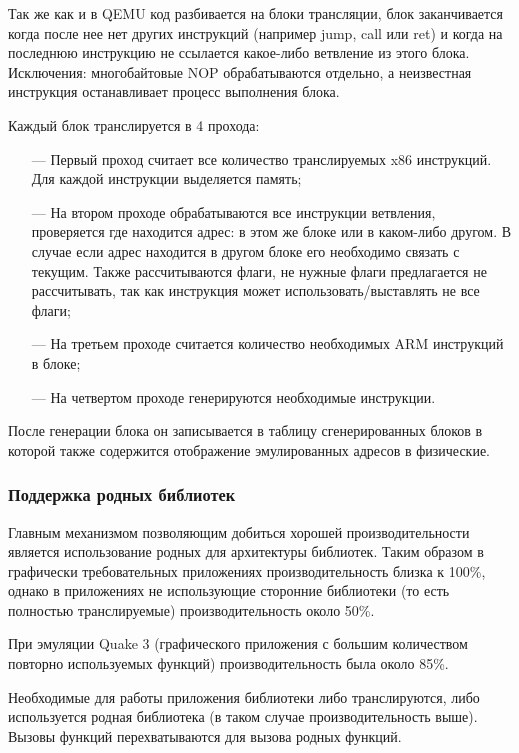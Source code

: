 Так же как и в QEMU код разбивается на блоки трансляции, блок заканчивается когда после нее нет других инструкций (например jump, call или ret) и когда на последнюю инструкцию не ссылается какое-либо ветвление из этого блока. Исключения: многобайтовые NOP обрабатываются отдельно, а неизвестная инструкция останавливает процесс выполнения блока.

Каждый блок транслируется в 4 прохода:
\begin{itemize}[leftmargin=1.6\parindent]
	\item[---] Первый проход считает все количество транслируемых x86 инструкций. Для каждой инструкции выделяется память;
	\item[---] На втором проходе обрабатываются все инструкции ветвления, проверяется где находится адрес: в этом же блоке или в каком-либо другом. В случае если адрес находится в другом блоке его необходимо связать с текущим. Также рассчитываются флаги, не нужные флаги предлагается не рассчитывать, так как инструкция может использовать/выставлять не все флаги;
	\item[---] На третьем проходе считается количество необходимых ARM инструкций в блоке;
	\item[---] На четвертом проходе генерируются необходимые инструкции.
\end{itemize}

После генерации блока он записывается в таблицу сгенерированных блоков в которой также содержится отображение эмулированных адресов в физические. \cite{box64_wide}

\subsubsection{Поддержка родных библиотек}

Главным механизмом позволяющим добиться хорошей производительности является использование родных для архитектуры библиотек. Таким образом в графически требовательных приложениях производительность близка к 100\%, однако в приложениях не использующие сторонние библиотеки (то есть полностью транслируемые) производительность около 50\%.

При эмуляции Quake 3 (графического приложения с большим количеством повторно используемых функций) производительность была около 85\%.

Необходимые для работы приложения библиотеки либо транслируются, либо используется родная библиотека (в таком случае производительность выше). Вызовы функций перехватываются для вызова родных функций. 

